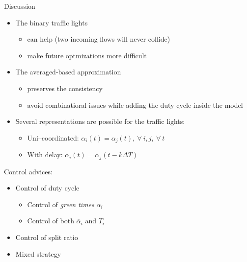 \begin{frame}[shrink=5]{Discussion}
    \begin{itemize}
    \item The binary traffic lights
    
    \begin{itemize}[label=\textendash]
    \item can help (two incoming flows will never collide)
    \item make future optmizations more difficult
    \end{itemize}
    
    \item The averaged-based approximation
    
    \begin{itemize}[label=\textendash]
    \item preserves the consistency
    \item avoid combinatioral issues while adding the duty cycle inside the model
    \end{itemize}
    
    \pause
    \item Several representations are possible for the traffic lights:
    \begin{itemize}[label=\textendash]
    \item Uni--coordinated: $\alpha_i(t) = \alpha_j(t),\ \forall\ i,j,\ \forall\ t$
    \item With delay: $\alpha_i(t) = \alpha_j(t-k\Delta{}T)$
    \end{itemize}
    
    \end{itemize}
    
    \pause
    
    Control advices:
    \begin{itemize}
    \item Control of duty cycle
    
    \begin{itemize}[label=\textendash]
    \item Control of \emph{green times} $\overline{\alpha}_i$
    \item Control of both $\overline{\alpha}_i$ and $T_i$
    \end{itemize}
    
    \item Control of split ratio
    \item Mixed strategy
    \end{itemize}
\end{frame}